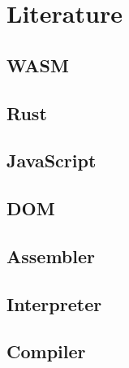 \newpage
\section{Literature} \label{infos}
\subsection{WASM} \label{wasm}

\subsection{Rust} \label{rust}

\subsection{JavaScript} \label{javascript}

\subsection{DOM} \label{dom}

\newpage
\subsection{Assembler} \label{assembler}

\subsection{Interpreter} \label{interpreter}

\subsection{Compiler} \label{compiler}
